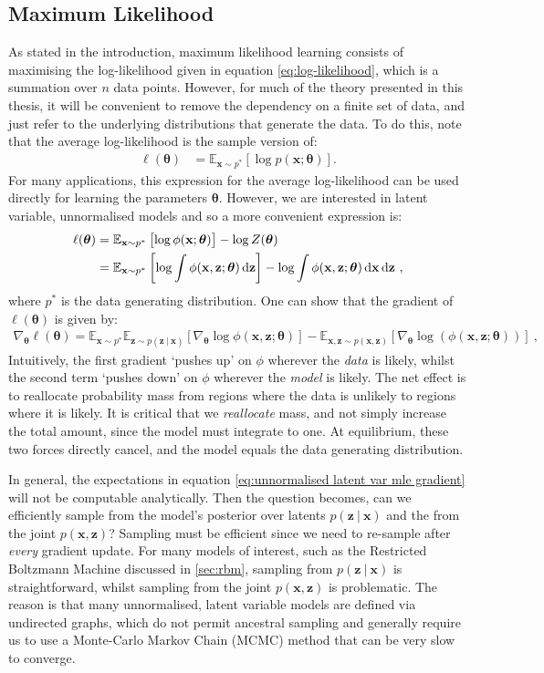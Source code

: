 \documentclass[11pt, oneside]{article}
\newcommand{\thetab}{{\boldsymbol{\theta}}}
\newcommand{\pnorm}{p}
\newcommand{\pnn}{\phi}
\newcommand{\gradtheta}{\nabla_{\thetab}}
\newcommand{\x}{{\mathbf x}}
\newcommand{\z}{{\mathbf z}}
\newcommand{\E}{\mathbb{E}}
\newcommand{\Edata}{\E_{\x \sim p^*}}
\newcommand\given[1][]{\:#1\vert\:}
\theoremstyle{definition}
\begin{document}
\subsection{Maximum Likelihood}
\label{sec:mle}
As stated in the introduction, maximum likelihood learning consists of maximising the log-likelihood given in equation \ref{eq:log-likelihood}, which is a summation over $n$ data points. However, for much of the theory presented in this thesis, it will be convenient to remove the dependency on a finite set of data, and just refer to the underlying distributions that generate the data. To do this, note that the average log-likelihood is the sample version of:
\begin{align}
\label{eq:expectation log-like}
\ell(\thetab) &= \Edata \left[ \log \pnorm(\x;\thetab) \right].
\end{align}
For many applications, this expression for the average log-likelihood can be used directly for learning the parameters $\thetab$. However, we are interested in latent variable, unnormalised models and so a more convenient expression is:
\begin{align}
\ell(\thetab) &= \Edata \left[\log \pnn(\x;\thetab) \right] - \log Z(\thetab) \\
              &= \Edata \left[ \log \int\pnn(\x, \z;\thetab) \dif \z \right] - \log \int\pnn(\x, \z;\thetab) \dif \x \dif \z \ ,
\end{align}
where $p^*$ is the data generating distribution. One can show that the gradient of $\ell(\thetab)$ is given by:
\begin{align}
    \label{eq:unnormalised latent var mle gradient}
    \gradtheta \ell(\thetab) = \Edata \E_{\z \sim p(\z \given \x)} \left[ \gradtheta \log \pnn(\x, \z;\thetab) \right] - \E_{\x, \z \sim p(\x, \z)} \left[\gradtheta \log \left(\pnn(\x, \z;\thetab) \right) \right] \ ,
\end{align}
Intuitively, the first gradient `pushes up' on $\pnn$ wherever the \emph{data} is likely, whilst the second term `pushes down' on  $\pnn$ wherever the \emph{model} is likely. The net effect is to reallocate probability mass from regions where the data is unlikely to regions where it is likely. It is critical that we \emph{reallocate} mass, and not simply increase the total amount, since the model must integrate to one. At equilibrium, these two forces directly cancel, and the model equals the data generating distribution.


In general, the expectations in equation \ref{eq:unnormalised latent var mle gradient} will not be computable analytically. Then the question becomes, can we efficiently sample from the model's posterior over latents $p(\z \given \x)$ and the from the joint $p(\x, \z)$? Sampling must be efficient since we need to re-sample after \emph{every} gradient update. For many models of interest, such as the Restricted Boltzmann Machine discussed in \ref{sec:rbm}, sampling from $p(\z \given \x)$ is straightforward, whilst sampling from the joint $p(\x, \z)$ is problematic. The reason is that many unnormalised, latent variable models are defined via undirected graphs, which do not permit ancestral sampling and generally require us to use a Monte-Carlo Markov Chain (MCMC) method that can be very slow to converge.
\end{document}
